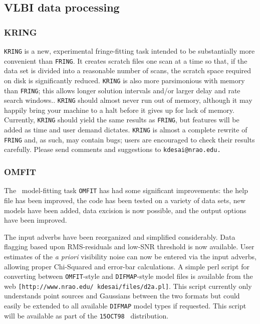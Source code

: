 \subsection{VLBI data processing}

\subsubsection{KRING}

{\tt KRING} is a new, experimental fringe-fitting task intended to be
substantially more convenient than \hbox{{\tt FRING}}.  It creates
scratch files one scan at a time so that, if the data set is divided
into a reasonable number of scans, the scratch space required on disk
is significantly reduced.  {\tt KRING} is also more parsimonious with
memory than {\tt FRING}; this allows longer solution intervals and/or
larger delay and rate search windows..  {\tt KRING} should almost
never run out of memory, although it may happily bring your machine to
a halt before it gives up for lack of memory.  Currently, {\tt KRING}
should yield the same results as {\tt FRING}, but features will be
added as time and user demand dictates.  {\tt KRING} is almost a
complete rewrite of {\tt FRING} and, as such, may contain bugs; users
are encouraged to check their results carefully.  Please send comments
and suggestions to {\tt kdesai@nrao.edu.}

\subsubsection{OMFIT}

The \uv\ model-fitting task {\tt OMFIT} has had some significant
improvements: the help file has been improved, the code has been
tested on a variety of data sets, new models have been added, data
excision is now possible, and the output options have been improved.

The input adverbs have been reorganized and simplified considerably.
Data flagging based upon RMS-residuals and low-SNR threshold is now
available.  User estimates of the {\it a priori} visibility noise can
now be entered via the input adverbs, allowing proper Chi-Squared and
error-bar calculations.   A simple perl script for converting between
{\tt OMFIT}-style and {\tt DIFMAP}-style model files is available from
the web {\tt [http://www.nrao.edu/~kdesai/files/d2a.pl]}.  This script
currently only understands point sources and Gaussians between the two
formats but could easily be extended to all available {\tt DIFMAP}
model types if requested.  This script will be available as part of
the {\tt 15OCT98} \AIPS\ distribution.

